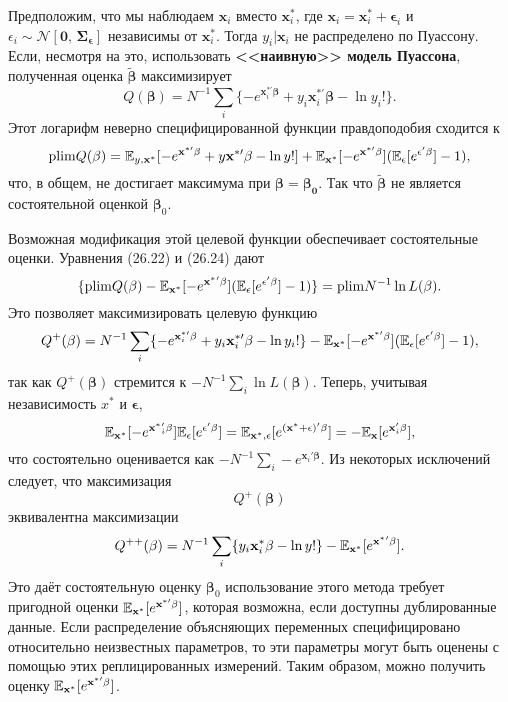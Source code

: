 Предположим, что мы наблюдаем $\mathbf{x}_i$ вместо $\mathbf{x}^*_i$, где $\mathbf{x}_i=\mathbf{x}^*_i+\mathbf{\epsilon}_i$ и $\epsilon_i \sim \mathcal{N}[\mathbf{0}, \, \mathbf{\Sigma_{\epsilon}}]$ независимы от $\mathbf{x}^*_i$. Тогда $y_i| \mathbf{x}_i$ не распределено по Пуассону. Если, несмотря на это, использовать {\bf  <<наивную>> модель Пуассона}, полученная оценка $\mathbf{\tilde{\beta}}$ максимизирует
\begin{equation}
Q(\mathbf{\beta})= N^{-1} \sum \limits_i \{ -e^{\mathbf{x}^{*\prime}_i \mathbf{\beta}} + y_i \mathbf{x}^{*\prime}_i \mathbf{\beta} - \ln y_i! \}.
\end{equation}
Этот логарифм неверно специфицированной функции правдоподобия сходится к
\begin{equation}
\mathrm{plim } Q(\mathbf{\beta})=\mathbb{E}_{y,\mathbf{x}^*}[-e^{\mathbf{x}^{*\prime} \mathbf{\beta}} + y \mathbf{x^{*\prime}} \mathbf{\beta} - \ln y! ] +  \mathbb{E}_{\mathbf{x^*}} [-e^{\mathbf{x^{*\prime}} \mathbf{\beta}}] (\mathbb{E}_{\epsilon}[e^{\mathbf{\epsilon}' \mathbf{\beta}}]-1),
\end{equation}
что, в общем, не достигает максимума при $\mathbf{\beta}= \mathbf{\beta_0}$. Так что $\mathbf{\tilde{\beta}}$ не является состоятельной оценкой $\mathbf{\beta}_0$.

Возможная модификация этой целевой функции обеспечивает состоятельные оценки. Уравнения (26.22) и (26.24) дают
\[
\{ \mathrm{plim } Q(\mathbf{\beta})-\mathbb{E}_{\mathbf{x^*}} [-e^{\mathbf{x^*}' \mathbf{\beta}}](\mathbb{E}_{\epsilon}[e^{\mathbf{\epsilon}' \mathbf{\beta}}]-1) \} = \mathrm{plim } N^{-1}\ln L(\mathbf{\beta}).
\]
Это позволяет максимизировать целевую функцию
\[
Q^+(\mathbf{\beta})=N^{-1} \sum \limits_i \{ -e^{\mathbf{x}^{*\prime}_i \mathbf{\beta}} + y_i \mathbf{x}^{*\prime}_i \mathbf{\beta} - \ln y_i! \} - \mathbb{E}_{\mathbf{x^*}} [-e^{\mathbf{x^{*\prime}} \mathbf{\beta}}](\mathbb{E}_{\epsilon}[e^{\mathbf{\epsilon}' \mathbf{\beta}}]-1),
\]
так как $Q^+(\mathbf{\beta})$ стремится к $-N^{-1} \sum \limits_i \ln L(\mathbf{\beta})$. Теперь, учитывая независимость $x^*$ и $\mathbf{\epsilon}$,
\[
\mathbb{E}_{\mathbf{x^*}}[ -e^{\mathbf{x^*}'_i \mathbf{\beta}}]\mathbb{E}_{\epsilon}[e^{\mathbf{\epsilon}' \mathbf{\beta}}] = \mathbb{E}_{\mathbf{x^*},\epsilon}[e^{(\mathbf{x^*}+\mathbf{\epsilon})' \mathbf{\beta}}]=-\mathbb{E}_{\mathbf{x}}[e^{\mathbf{x}'_i \mathbf{\beta}}],
\]
что состоятельно оценивается как $-N^{-1} \sum \limits_i -e^{\mathbf{x}_i' \mathbf{\beta}}$. Из некоторых исключений следует, что максимизация $$Q^+(\mathbf{\beta})$$ эквивалентна максимизации
\begin{equation}
Q^{++}(\mathbf{\beta})=N^{-1} \sum \limits_i \{ y_i \mathbf{x}^*_i \mathbf{\beta} - \ln y! \} - \mathbb{E}_{\mathbf{x^*}} [e^{\mathbf{x^*}' \mathbf{\beta}}].
\end{equation}
Это даёт состоятельную оценку $\mathbf{\beta}_0$ использование этого метода требует пригодной оценки $\mathbb{E}_{\mathbf{x}^*}[ e^{\mathbf{x}^{*\prime} \mathbf{\beta}}]$, которая возможна, если доступны дублированные данные. Если распределение объясняющих переменных специфицировано относительно неизвестных параметров, то эти параметры могут быть оценены с помощью этих реплицированных измерений. Таким образом, можно получить оценку $\mathbb{E}_{\mathbf{x}^*}[ e^{\mathbf{x}^{*\prime} \mathbf{\beta}}]$.


